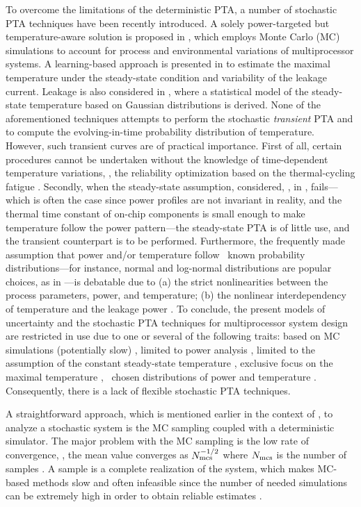To overcome the limitations of the deterministic PTA, a number of stochastic PTA techniques have been recently introduced. A solely power-targeted but temperature-aware solution is proposed in \cite{chandra2010}, which employs Monte Carlo (MC) simulations to account for process and environmental variations of multiprocessor systems. A learning-based approach is presented in \cite{juan2011} to estimate the maximal temperature under the steady-state condition and variability of the leakage current. Leakage is also considered in \cite{juan2012}, where a statistical model of the steady-state temperature based on Gaussian distributions is derived. None of the aforementioned techniques attempts to perform the stochastic \emph{transient} PTA and to compute the evolving-in-time probability distribution of temperature. However, such transient curves are of practical importance. First of all, certain procedures cannot be undertaken without the knowledge of time-dependent temperature variations, \eg, the reliability optimization based on the thermal-cycling fatigue \cite{ukhov2012}. Secondly, when the steady-state assumption, considered, \eg, in \cite{juan2011, juan2012}, fails---which is often the case since power profiles are not invariant in reality, and the thermal time constant of on-chip components is small enough to make temperature follow the power pattern---the steady-state PTA is of little use, and the transient counterpart is to be performed. Furthermore, the frequently made assumption that power and/or temperature follow \apriori\ known probability distributions---for instance, normal and log-normal distributions are popular choices, as in \cite{juan2012, srivastava2010}---is debatable due to (a) the strict nonlinearities between the process parameters, power, and temperature; (b) the nonlinear interdependency of temperature and the leakage power \cite{liu2007}. To conclude, the present models of uncertainty and the stochastic PTA techniques for multiprocessor system design are restricted in use due to one or several of the following traits: based on MC simulations (potentially slow) \cite{chandra2010}, limited to power analysis \cite{chandra2010}, limited to the assumption of the constant steady-state temperature \cite{juan2011, juan2012}, exclusive focus on the maximal temperature \cite{juan2011}, \apriori\ chosen distributions of power and temperature \cite{juan2012, srivastava2010}. Consequently, there is a lack of flexible stochastic PTA techniques.

A straightforward approach, which is mentioned earlier in the context of \cite{chandra2010}, to analyze a stochastic system is the MC sampling coupled with a deterministic simulator. The major problem with the MC sampling is the low rate of convergence, \eg, the mean value converges as $N_\text{mcs}^{-{{1}/{2}}}$ where $N_\text{mcs}$ is the number of samples \cite{xiu2010, maitre2010}. A sample is a complete realization of the system, which makes MC-based methods slow and often infeasible since the number of needed simulations can be extremely high in order to obtain reliable estimates \cite{diaz-emparanza2002}.

